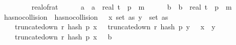 \begin{isabellebody}
\ \ \isamarkupfalse%
\ {\isasymdelta}{\isacharprime}{\kern0pt}\ \ {\isachardoublequoteopen}{\isasymdelta}{\isacharprime}{\kern0pt}\ {\isacharequal}{\kern0pt}\ {}{\isacharasterisk}{\kern0pt}\ real{\isacharunderscore}{\kern0pt}of{\isacharunderscore}{\kern0pt}rat\ {\isasymdelta}\ {\isacharslash}{\kern0pt}{}{\isachardoublequoteclose}\isanewline
\ \ \isamarkupfalse%
\ a\ \ {\isachardoublequoteopen}a\ {\isacharequal}{\kern0pt}\ {\isasymlfloor}real\ t\ {\isacharasterisk}{\kern0pt}\ p\ {\isacharslash}{\kern0pt}\ {\isacharparenleft}{\kern0pt}m\ {\isacharasterisk}{\kern0pt}\ {\isacharparenleft}{\kern0pt}{}{\isacharplus}{\kern0pt}{\isasymdelta}{\isacharprime}{\kern0pt}{\isacharparenright}{\kern0pt}{\isacharparenright}{\kern0pt}{\isasymrfloor}{\isachardoublequoteclose}\isanewline
\ \ \isamarkupfalse%
\ b\ \ {\isachardoublequoteopen}b\ {\isacharequal}{\kern0pt}\ {\isasymlceil}real\ t\ {\isacharasterisk}{\kern0pt}\ p\ {\isacharslash}{\kern0pt}\ {\isacharparenleft}{\kern0pt}m\ {\isacharasterisk}{\kern0pt}\ {\isacharparenleft}{\kern0pt}{}{\isacharminus}{\kern0pt}{\isasymdelta}{\isacharprime}{\kern0pt}{\isacharparenright}{\kern0pt}{\isacharparenright}{\kern0pt}{\isacharminus}{\kern0pt}{}{\isasymrceil}{\isachardoublequoteclose}\isanewline
\isanewline
\ \ \isamarkupfalse%
\ has{\isacharunderscore}{\kern0pt}no{\isacharunderscore}{\kern0pt}collision\ \ {\isachardoublequoteopen}has{\isacharunderscore}{\kern0pt}no{\isacharunderscore}{\kern0pt}collision\ {\isacharequal}{\kern0pt}\ {\isacharparenleft}{\kern0pt}{\isasymlambda}{\isasymomega}{\isachardot}{\kern0pt}\ {\isasymforall}x{\isasymin}\ set\ as{\isachardot}{\kern0pt}\ {\isasymforall}y\ {\isasymin}\ set\ as{\isachardot}{\kern0pt}\isanewline
\ \ \ \ {\isacharparenleft}{\kern0pt}truncate{\isacharunderscore}{\kern0pt}down\ r\ {\isacharparenleft}{\kern0pt}hash\ p\ x\ {\isasymomega}{\isacharparenright}{\kern0pt}\ {\isacharequal}{\kern0pt}\ truncate{\isacharunderscore}{\kern0pt}down\ r\ {\isacharparenleft}{\kern0pt}hash\ p\ y\ {\isasymomega}{\isacharparenright}{\kern0pt}\ {\isasymlongrightarrow}\ x\ {\isacharequal}{\kern0pt}\ y{\isacharparenright}{\kern0pt}\ {\isasymor}\ \isanewline
\ \ \ \ truncate{\isacharunderscore}{\kern0pt}down\ r\ {\isacharparenleft}{\kern0pt}hash\ p\ x\ {\isasymomega}{\isacharparenright}{\kern0pt}\ {\isachargreater}{\kern0pt}\ b{\isacharparenright}{\kern0pt}{\isachardoublequoteclose}\isanewline
\isanewline

\end{isabellebody}
